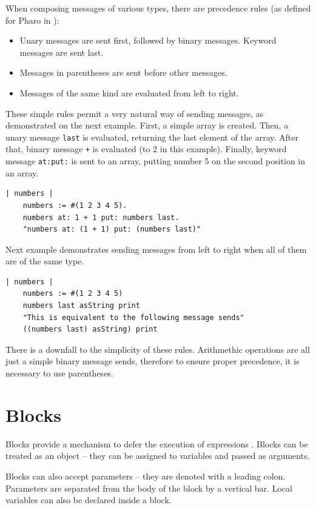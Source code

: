 \documentclass[thesis=M,english]{FITthesis}[2019/12/23]
\begin{document}
When composing messages of various types, there are precedence rules (as defined for Pharo in \cite{pharo-by-example}):
\begin{itemize}
	\item Unary messages are sent first, followed by binary messages. Keyword messages are sent last.
	\item Messages in parentheses are sent before other messages.
	\item Messages of the same kind are evaluated from left to right.
\end{itemize}

These simple rules permit a very natural way of sending messages, as demonstrated on the next example.
First, a simple array is created. Then, a unary message \texttt{last} is evaluated, returning the last
element of the array. After that, binary message \texttt{+} is evaluated (to 2 in this example). Finally,
keyword message \texttt{at:put:} is sent to an array, putting number 5 on the second position in an array.
\begin{lstlisting}[language=Smalltalk]
	| numbers |
	numbers := #(1 2 3 4 5).
	numbers at: 1 + 1 put: numbers last.
	"numbers at: (1 + 1) put: (numbers last)"
\end{lstlisting}

Next example demonstrates sending messages from left to right when all of them are of the same type.
\begin{lstlisting}[language=Smalltalk]
	| numbers |
	numbers := #(1 2 3 4 5)
	numbers last asString print
	"This is equivalent to the following message sends"
	((numbers last) asString) print
\end{lstlisting}

There is a downfall to the simplicity of these rules. Arithmethic operations are all just a simple binary
message sends, therefore to ensure proper precedence, it is necessary to use parentheses.

\section{Blocks}
Blocks provide a mechanism to defer the execution of expressions \cite{pharo-by-example}.
Blocks can be treated as an object -- they can be assigned to variables and
passed as arguments. 

Blocks can also accept parameters -- they are denoted with a leading colon. Parameters are separated from the body
of the block by a vertical bar. Local variables can also be declared inside a block.
\end{document}

